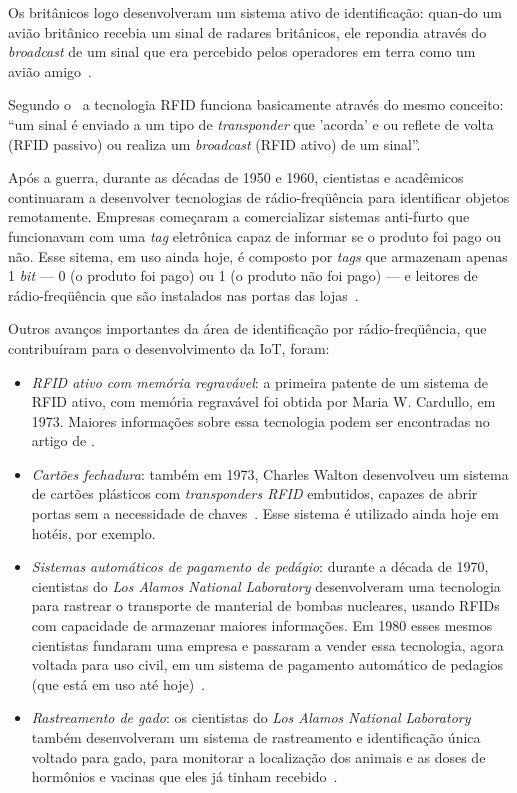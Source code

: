 \documentclass[pdftex, brazil, 12pt, twoside]{article}
\newcommand{\ingles}[1]{\textit{#1}}
\begin{document}
Os britânicos logo desenvolveram um sistema ativo de identificação: quan-do
um avião britânico recebia um sinal de radares britânicos, ele repondia através
do \emph{broadcast} de um sinal que era percebido pelos operadores em terra
como um avião amigo~\citep{IEEEIoTDefinition}.

Segundo o~\citet{IEEEIoTDefinition} a tecnologia RFID funciona basicamente
através do mesmo conceito: ``um sinal é enviado a um tipo de \emph{transponder}
que 'acorda' e ou reflete de volta (RFID passivo) ou realiza
um \emph{broadcast} (RFID ativo) de um sinal''.

Após a guerra, durante as décadas de 1950 e 1960, cientistas e acadêmicos
continuaram a desenvolver tecnologias de rádio-freqüência para identificar
objetos remotamente. Empresas começaram a comercializar sistemas anti-furto
que funcionavam com uma \ingles{tag} eletrônica capaz de informar se o produto
foi pago ou não. Esse sitema, em uso ainda hoje, é composto por \ingles{tags}
que armazenam apenas 1 \ingles{bit} --- 0 (o produto foi pago) ou 1 (o produto não
foi pago) --- e leitores de rádio-freqüência que são instalados nas portas
das lojas~\citep{IEEEIoTDefinition}.

Outros avanços importantes da área de identificação por rádio-freqüência, que
contribuíram para o desenvolvimento da IoT, foram:

\begin{itemize}
\item \emph{RFID ativo com memória regravável}: a primeira patente de um sistema de RFID ativo,
  com memória regravável foi obtida por Maria W. Cardullo, em 1973. Maiores informações
  sobre essa tecnologia podem ser encontradas no artigo de \citet{CardulloRFIDGenesis2003}.
\item \emph{Cartões fechadura}: também em 1973, Charles Walton desenvolveu um sistema
  de cartões plásticos com \ingles{transponders RFID} embutidos, capazes de abrir
  portas sem a necessidade de chaves~\citep{IEEEIoTDefinition}. Esse sistema é
  utilizado ainda hoje em hotéis, por exemplo.
\item \emph{Sistemas automáticos de pagamento de pedágio}: durante a década de 1970,
  cientistas do \emph{Los Alamos National Laboratory} desenvolveram uma tecnologia
  para rastrear o transporte de manterial de bombas nucleares, usando RFIDs com
  capacidade de armazenar maiores informações. Em 1980 esses mesmos cientistas
  fundaram uma empresa e passaram a vender essa tecnologia, agora voltada
  para uso civil, em um sistema de pagamento automático de pedagios (que está em uso
  até hoje)~\citep{IEEEIoTDefinition}.
\item \emph{Rastreamento de gado}: os cientistas do \emph{Los Alamos National Laboratory}
  também desenvolveram um sistema de rastreamento e identificação única voltado
  para gado, para monitorar a localização dos animais e as doses de hormônios e
  vacinas que eles já tinham recebido~\citep{IEEEIoTDefinition}.
\end{itemize}
\end{document}
